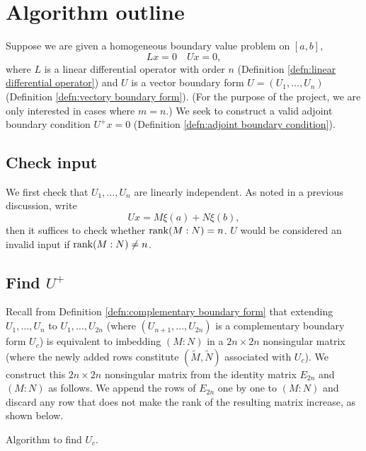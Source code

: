 \documentclass[11pt, oneside, a4paper]{article}
\begin{document}
\section{Algorithm outline}
Suppose we are given a homogeneous boundary value problem on $[a,b]$,
\[Lx=0\quad Ux=0,\]
where $L$ is a linear differential operator with order $n$ (Definition \ref{defn:linear differential operator}) and $U$ is a vector boundary form $U=(U_1,\ldots, U_n)$ (Definition \ref{defn:vectory boundary form}). (For the purpose of the project, we are only interested in cases where $m=n$.) We seek to construct a valid adjoint boundary condition $U^+x=0$ (Definition \ref{defn:adjoint boundary condition}). 

\subsection{Check input}
We first check that $U_1,\ldots, U_n$ are linearly independent. As noted in a previous discussion, write
\[Ux = M\xi(a) + N\xi(b),\]
then it suffices to check whether $\operatorname{rank}(M:N)=n$. $U$ would be considered an invalid input if $\operatorname{rank}(M:N)\neq n$.

\subsection{Find $U^+$}
Recall from Definition \ref{defn:complementary boundary form} that extending $U_1,\ldots,U_n$ to $U_1,\ldots,U_{2n}$ (where $(U_{n+1},\ldots, U_{2n})$ is a complementary boundary form $U_c$) is equivalent to imbedding $(M:N)$ in a $2n\times 2n$ nonsingular matrix (where the newly added rows constitute $(\tilde{M}, \tilde{N})$ associated with $U_c$). We construct this $2n\times 2n$ nonsingular matrix from the identity matrix $E_{2n}$ and $(M:N)$ as follows. We append the rows of $E_{2n}$ one by one to $(M:N)$ and discard any row that does not make the rank of the resulting matrix increase, as shown below.

\begin{algorithm}[H]
    \caption{Algorithm to find $U_c$.}\label{algo:Find $U_c$.}
\end{algorithm}
\end{document}
